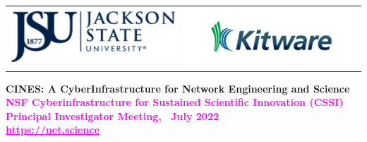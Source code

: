 \documentclass[landscape,paperwidth=70in,paperheight=46in,fontscale=0.225]{baposter} %
\begin{document}
\begin{poster}
{\begin{tabular}{c c}
\includegraphics[scale=0.4]{logos/jsu.png} &
\includegraphics[scale=0.4]{logos/kitware.png} \\
\end{tabular}
}
{\textbf{CINES: A CyberInfrastructure for Network Engineering and Science} \\
\vspace{-3mm}
{
           \textcolor{magenta}{%
               {\textbf{\Large{NSF Cyberinfrastructure for Sustained Scientific Innovation (CSSI) Principal Investigator Meeting,~ July 2022}}}} \\
               \vspace{2.5mm}
                 \textbf{\Large{\textcolor{magenta}{\underline{https://net.science}}}}            
            } }%
            

\end{poster}
\end{document}
